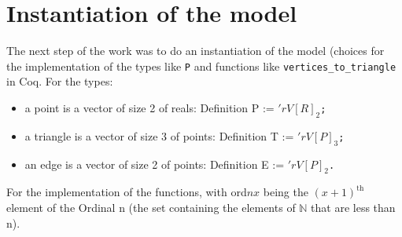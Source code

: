 \documentclass[a4paper,10pt]{article}
\def\definition#1#2{{\color{purple}Definition} {\color{blue}#1} := {\tt #2}}
\begin{document}
\section{Instantiation of the model}
\label{implementation}
The next step of the work was to do an instantiation of the model (choices for the implementation of the types like {\tt P} and functions like {\tt vertices\_to\_triangle} in {\sc Coq}. For the types:
\begin{itemize}
\item a point is a vector of size 2 of reals: \definition{P}{$'rV[R]_2$; }
\item a triangle is a vector of size 3 of points: \definition{T}{$'rV[P]_3$; }
\item an edge is a vector of size 2 of points: \definition{E}{$'rV[P]_2$. }
\end{itemize}
For the implementation of the functions, with ord$nx$ being the $(x+1)^{\text{th}}$ element of the Ordinal n (the set containing the elements of $\mathbb{N}$ that are less than n).
\end{document}
